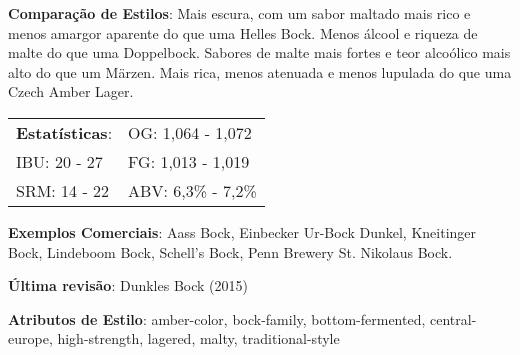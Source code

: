 \textbf{Comparação de Estilos}: Mais escura, com um sabor maltado mais rico e menos amargor aparente do que uma Helles Bock. Menos álcool e riqueza de malte do que uma Doppelbock. Sabores de malte mais fortes e teor alcoólico mais alto do que um Märzen. Mais rica, menos atenuada e menos lupulada do que uma Czech Amber Lager.

\begin{tabular}{@{}p{35mm}p{35mm}@{}}
  \textbf{Estatísticas}: & OG: 1,064 - 1,072 \\
  IBU: 20 - 27 & FG: 1,013 - 1,019 \\
  SRM: 14 - 22 & ABV: 6,3\% - 7,2\%
\end{tabular}

\textbf{Exemplos Comerciais}: Aass Bock, Einbecker Ur-Bock Dunkel, Kneitinger Bock, Lindeboom Bock, Schell’s Bock, Penn Brewery St. Nikolaus Bock.

\textbf{Última revisão}: Dunkles Bock (2015)

\textbf{Atributos de Estilo}: amber-color, bock-family, bottom-fermented, central-europe, high-strength, lagered, malty, traditional-style
